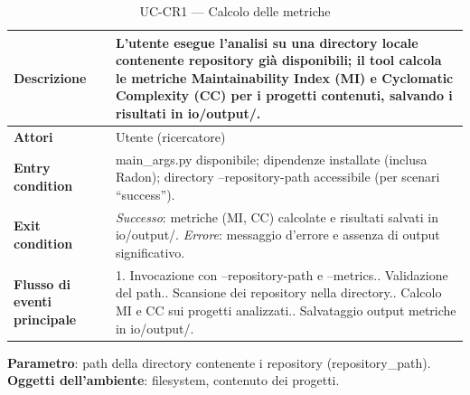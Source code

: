 \documentclass[11pt,a4paper]{article}
\makeatletter
\newif\ifmark@prevlower
\def\mark@casebreak#1{%
  \ifcat\noexpand#1\relax
    \mark@prevlowerfalse
  \else
    \ifnum`#1=\uccode`#1\relax
      \ifmark@prevlower\allowbreak\fi
      \mark@prevlowerfalse
    \else
      \ifnum`#1=\lccode`#1\relax
        \mark@prevlowertrue
      \else
        \mark@prevlowerfalse
      \fi
    \fi
  \fi}
\def\mark@brk#1{%
  \ifx#1\mark@stop
    \let\mark@next\relax
  \else
    \mark@casebreak{#1}%
    #1%
    \ifx#1.\allowbreak\else
      \ifx#1\_\allowbreak\else
        \ifx#1/\allowbreak\else
          \ifx#1(\allowbreak\fi
        \fi
      \fi
    \fi
    \let\mark@next\mark@brk
  \fi
  \mark@next}
\def\mark@stop{\mark@stop}
\DeclareRobustCommand{\mark@code}[1]{%
  \ifmmode
    \text{\ttfamily\small\mark@prevlowerfalse\mark@brk#1\mark@stop}%
  \else
    {\ttfamily\small\mark@prevlowerfalse\mark@brk#1\mark@stop}%
  \fi}
\DeclareRobustCommand{\pkgpath}[1]{\mark@code{#1}}
\DeclareRobustCommand{\file}[1]{\mark@code{#1}}
\DeclareRobustCommand{\flag}[1]{\mark@code{#1}}
\def\mark@code#1{#1}%
\def\pkgpath#1{#1}%
\def\file#1{#1}%
\def\flag#1{#1}%
\newcommand{\thead}[1]{\textbf{#1}}
\makeatother
\begin{document}
\begin{table}[H]
  \centering\small
  \caption{UC-CR1 --- Calcolo delle metriche}
  \label{tab:uc-cr1}
  \begin{tabularx}{\linewidth}{@{}L{3.3cm} Y@{}}
    \toprule
    \thead{Descrizione} & L'utente esegue l'analisi su una directory locale
      contenente repository gi\`a disponibili; il tool calcola le metriche
      Maintainability Index (MI) e Cyclomatic Complexity (CC) per i progetti
      contenuti, salvando i risultati in \pkgpath{io/output/}.\\
    \midrule
    \thead{Attori} & Utente (ricercatore)\\
    \midrule
    \thead{Entry condition} & \file{main\_args.py} disponibile; dipendenze
      installate (inclusa Radon); directory \flag{--repository-path}
      accessibile (per scenari ``success'').\\
    \midrule
    \thead{Exit condition} &
      \emph{Successo}: metriche (MI, CC) calcolate e risultati salvati in
      \pkgpath{io/output/}.\newline
      \emph{Errore}: messaggio d'errore e assenza di output significativo.\\
    \midrule
    \thead{Flusso di eventi principale} &
      1. Invocazione con \flag{--repository-path} e \flag{--metrics}.. Validazione del path.. Scansione dei repository nella directory.. Calcolo MI e CC sui progetti analizzati.. Salvataggio output metriche in \pkgpath{io/output/}.\\
    \bottomrule
  \end{tabularx}
\end{table}

\textbf{Parametro}: path della directory contenente i repository
(\flag{repository\_path}). \quad
\textbf{Oggetti dell'ambiente}: filesystem, contenuto dei progetti.
\end{document}
